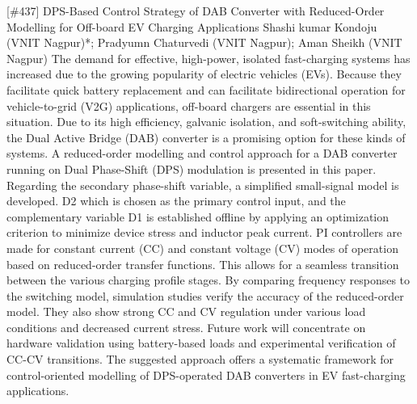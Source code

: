 {} \begin{abstract_online} {[\#437] DPS-Based Control Strategy of DAB Converter with Reduced-Order Modelling for Off-board EV Charging Applications} {} {Shashi kumar Kondoju (VNIT Nagpur)*; Pradyumn Chaturvedi (VNIT Nagpur); Aman Sheikh (VNIT Nagpur)} {} The demand for effective, high-power, isolated fast-charging systems has increased due to the growing popularity of electric vehicles (EVs). Because they facilitate quick battery replacement and can facilitate bidirectional operation for vehicle-to-grid (V2G) applications, off-board chargers are essential in this situation. Due to its high efficiency, galvanic isolation, and soft-switching ability, the Dual Active Bridge (DAB) converter is a promising option for these kinds of systems. A reduced-order modelling and control approach for a DAB converter running on Dual Phase-Shift (DPS) modulation is presented in this paper. Regarding the secondary phase-shift variable, a simplified small-signal model is developed. D2 which is chosen as the primary control input, and the complementary variable  D1 is established offline by applying an optimization criterion to minimize device stress and inductor peak current. PI controllers are made for constant current (CC) and constant voltage (CV) modes of operation based on reduced-order transfer functions. This allows for a seamless transition between the various charging profile stages. By comparing frequency responses to the switching model, simulation studies verify the accuracy of the reduced-order model. They also show strong CC and CV regulation under various load conditions and decreased current stress. Future work will concentrate on hardware validation using battery-based loads and experimental verification of CC-CV transitions. The suggested approach offers a systematic framework for control-oriented modelling of DPS-operated DAB converters in EV fast-charging applications. \end{abstract_online} 
